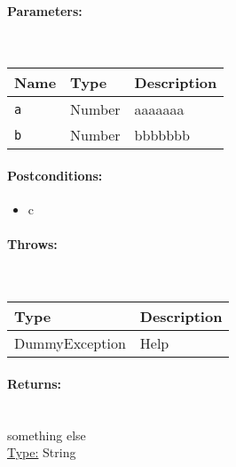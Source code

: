 \paragraph{Parameters:} \hfill \\ 
\begin{tabular}{|l|l|l|}
\hline
\textbf{Name} & \textbf{Type} & \textbf{Description} \\ 
\hline
\texttt{a} & Number & aaaaaaa\\ 
\hline
\texttt{b} & Number & bbbbbbb\\ 
\hline
\end{tabular}
\paragraph{Postconditions:}
\begin{itemize}  
\item  c
\end{itemize}  
\paragraph{Throws:} \hfill \\ 
\begin{tabular}{|l|l|}
\hline
\textbf{Type} & \textbf{Description} \\ 
\hline
DummyException & Help\\ 
\hline
\end{tabular}
\paragraph{Returns:} \hfill \\ 
something else\\ 
\underline{Type:} String
